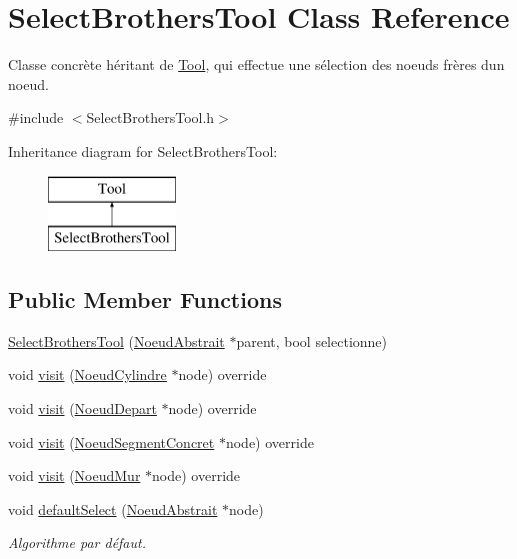 \hypertarget{class_select_brothers_tool}{}\section{Select\+Brothers\+Tool Class Reference}
\label{class_select_brothers_tool}


Classe concrète héritant de \hyperlink{class_tool}{Tool}, qui effectue une sélection des noeuds frères d\textquotesingle{}un noeud.  




{\ttfamily \#include $<$Select\+Brothers\+Tool.\+h$>$}

Inheritance diagram for Select\+Brothers\+Tool\+:\begin{figure}[H]
\begin{center}
\leavevmode
\includegraphics[height=2.000000cm]{class_select_brothers_tool}
\end{center}
\end{figure}
\subsection*{Public Member Functions}
\begin{DoxyCompactItemize}
\item 
\hyperlink{group__inf2990_gaa7c8bdba711edc6d4817c02c19f3dbe0}{Select\+Brothers\+Tool} (\hyperlink{class_noeud_abstrait}{Noeud\+Abstrait} $\ast$parent, bool selectionne)
\item 
void \hyperlink{group__inf2990_ga107677b2987385a2604f9c3ec11670b6}{visit} (\hyperlink{class_noeud_cylindre}{Noeud\+Cylindre} $\ast$node) override
\item 
void \hyperlink{group__inf2990_gac19bea128f3c4fb5084a44c761482ec9}{visit} (\hyperlink{class_noeud_depart}{Noeud\+Depart} $\ast$node) override
\item 
void \hyperlink{group__inf2990_gaf85983eda4fdee6755880c48d5acef1e}{visit} (\hyperlink{class_noeud_segment_concret}{Noeud\+Segment\+Concret} $\ast$node) override
\item 
void \hyperlink{group__inf2990_gaa9bd4b29b9f7865ac1903de6b6e5a0ca}{visit} (\hyperlink{class_noeud_mur}{Noeud\+Mur} $\ast$node) override
\item 
void \hyperlink{group__inf2990_ga53a73bc192206845143b838a267a7a3e}{default\+Select} (\hyperlink{class_noeud_abstrait}{Noeud\+Abstrait} $\ast$node)
\begin{DoxyCompactList}\small\item\em Algorithme par défaut. \end{DoxyCompactList}\end{DoxyCompactItemize}


